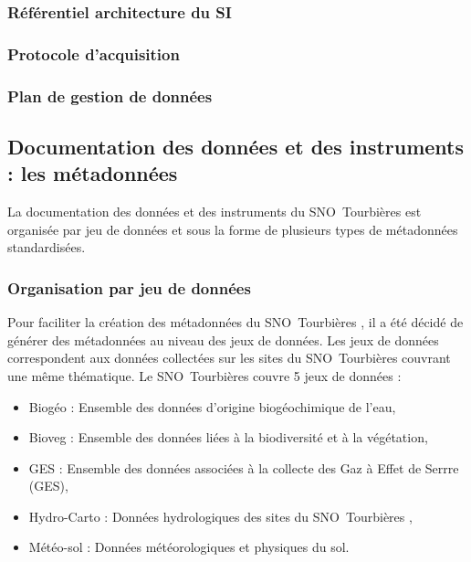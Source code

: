 \documentclass[]{article}
\newcommand{\SNOT}{{SNO~Tourbières }}
\begin{document}
\subsubsection{Référentiel architecture du SI}

\subsubsection{Protocole d'acquisition}

\subsubsection{Plan de gestion de données}





\subsection{Documentation des données et des instruments : les métadonnées}

La documentation des données et des instruments du \SNOT est organisée par jeu de données et sous la forme de plusieurs types de métadonnées standardisées.

\subsubsection{Organisation par jeu de données}
Pour faciliter la création des métadonnées du \SNOT, il a été décidé de générer des métadonnées au niveau des jeux de données. Les jeux de données correspondent aux données collectées sur les sites du \SNOT couvrant une même thématique. Le \SNOT couvre 5 jeux de données :

	\begin{itemize}
		\item Biogéo : Ensemble des données d'origine biogéochimique de l'eau,
		\item Bioveg : Ensemble des données liées à la biodiversité et à la végétation,
		\item GES : Ensemble des données associées à la collecte des Gaz à Effet de Serrre (GES),
		\item Hydro-Carto : Données hydrologiques des sites du \SNOT,
		\item Météo-sol : Données météorologiques et physiques du sol.
	\end{itemize}
\end{document}
